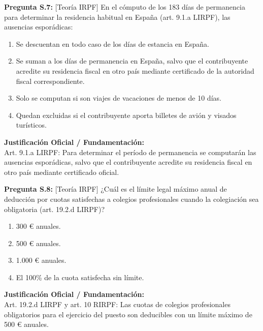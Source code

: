 \documentclass[11pt,a4paper,openany]{article}
\begin{document}
\noindent\textbf{\sffamily Pregunta S.7:} [Teoría IRPF] En el cómputo de los 183 días de permanencia para determinar la residencia habitual en España (art. 9.1.a LIRPF), las ausencias esporádicas:\\[0.15cm]
\begin{enumerate}[label=\textbf{\alph*)},leftmargin=1.8em,itemsep=1.5pt,topsep=2pt,partopsep=0pt,parsep=0pt]
    \item Se descuentan en todo caso de los días de estancia en España.
    \item Se suman a los días de permanencia en España, salvo que el contribuyente acredite su residencia fiscal en otro país mediante certificado de la autoridad fiscal correspondiente.
    \item Solo se computan si son viajes de vacaciones de menos de 10 días.
    \item Quedan excluidas si el contribuyente aporta billetes de avión y visados turísticos.
\end{enumerate}
\begin{solucionBox}
\textbf{Justificación Oficial / Fundamentación:}\\[0.1cm]
Art. 9.1.a LIRPF: Para determinar el período de permanencia se computarán las ausencias esporádicas, salvo que el contribuyente acredite su residencia fiscal en otro país mediante certificado oficial.
\end{solucionBox}
\vspace{0.35cm}

\noindent\textbf{\sffamily Pregunta S.8:} [Teoría IRPF] ¿Cuál es el límite legal máximo anual de deducción por cuotas satisfechas a colegios profesionales cuando la colegiación sea obligatoria (art. 19.2.d LIRPF)?\\[0.15cm]
\begin{enumerate}[label=\textbf{\alph*)},leftmargin=1.8em,itemsep=1.5pt,topsep=2pt,partopsep=0pt,parsep=0pt]
    \item 300 \euro{} anuales.
    \item 500 \euro{} anuales.
    \item 1.000 \euro{} anuales.
    \item El 100\% de la cuota satisfecha sin límite.
\end{enumerate}
\begin{solucionBox}
\textbf{Justificación Oficial / Fundamentación:}\\[0.1cm]
Art. 19.2.d LIRPF y art. 10 RIRPF: Las cuotas de colegios profesionales obligatorios para el ejercicio del puesto son deducibles con un límite máximo de 500 \euro{} anuales.
\end{solucionBox}
\vspace{0.35cm}
\end{document}
